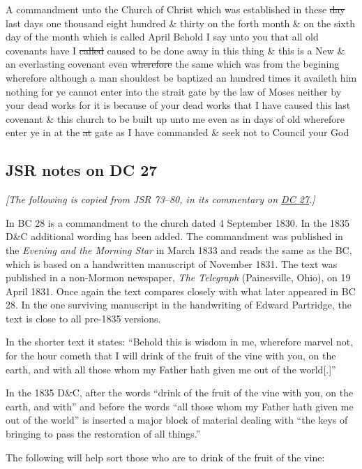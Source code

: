 		A commandment unto the Church of Christ which was established in these \sout{day} last days one thousand eight hundred \& thirty on the forth month \& on the sixth day of the month which is called April Behold I say unto you that all old covenants have I \sout{called} caused to be done away in this thing \& this is a New \& an everlasting covenant even \sout{wherefore} the same which was from the begining wherefore although a man shouldest be baptized an hundred times it availeth him nothing for ye cannot enter into the strait gate by the law of Moses neither by your dead works for it is because of your dead works that I have caused this last covenant \& this church to be built up unto me even as in days of old wherefore enter ye in at the \sout{at} gate as I have commanded \& seek not to Council your God
		
	\subsection{JSR notes on DC 27}
		\label{EXSS-DC27-JSR}
		
		\textit{[The following is copied from JSR 73--80, in its commentary on \hyperref[DC27]{DC 27}.]}
		
		In BC 28 is a commandment to the church dated 4 September 1830. In the 1835 D\&C additional wording has been added. The commandment was published in the \textit{Evening and the Morning Star} in March 1833 and reads the same as the BC, which is based on a handwritten manuscript of November 1831. The text was published in a non-Mormon newspaper, \textit{The Telegraph} (Painesville, Ohio), on 19 April 1831. Once again the text compares closely with what later appeared in BC 28. In the one surviving manuscript in the handwriting of Edward Partridge, the text is close to all pre-1835 versions.

		In the shorter text it states: ``Behold this is wisdom in me, wherefore marvel not, for the hour cometh that I will drink of the fruit of the vine with you, on the earth, and with all those whom my Father hath given me out of the world[.]''

		In the 1835 D\&C, after the words ``drink of the fruit of the vine with you, on the earth, and with'' and before the words ``all those whom my Father hath given me out of the world'' is inserted a major block of material dealing with ``the keys of bringing to pass the restoration of all things.''

		The following will help sort those who are to drink of the fruit of the vine:
		
